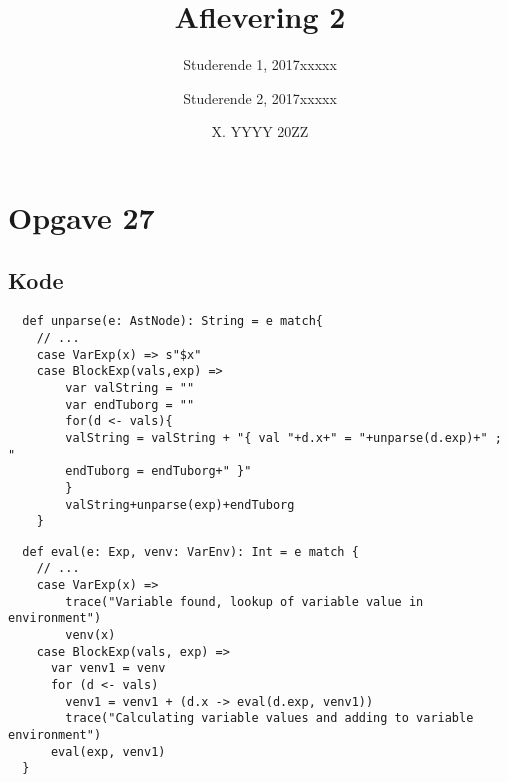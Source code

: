 \documentclass[a4paper, 10pt]{article}
\title{Aflevering 2}
\author{Studerende 1, 2017xxxxx \and Studerende 2, 2017xxxxx}
\date{X. YYYY 20ZZ}
\theoremstyle{remark}
\begin{document}
\maketitle
\section*{Opgave 27}
\subsection*{Kode}
\begin{lstlisting}
  def unparse(e: AstNode): String = e match{
  	// ...
  	case VarExp(x) => s"$x"
  	case BlockExp(vals,exp) =>
  		var valString = ""
	  	var endTuborg = ""
  		for(d <- vals){
	  	valString = valString + "{ val "+d.x+" = "+unparse(d.exp)+" ; "
	  	endTuborg = endTuborg+" }"
	  	}
  		valString+unparse(exp)+endTuborg
    }
\end{lstlisting}
\begin{lstlisting}
  def eval(e: Exp, venv: VarEnv): Int = e match {
    // ...
    case VarExp(x) => 
    	trace("Variable found, lookup of variable value in environment")
    	venv(x)
    case BlockExp(vals, exp) =>
      var venv1 = venv
      for (d <- vals)
        venv1 = venv1 + (d.x -> eval(d.exp, venv1))
        trace("Calculating variable values and adding to variable environment")
      eval(exp, venv1)
  }
\end{lstlisting}
\end{document}
